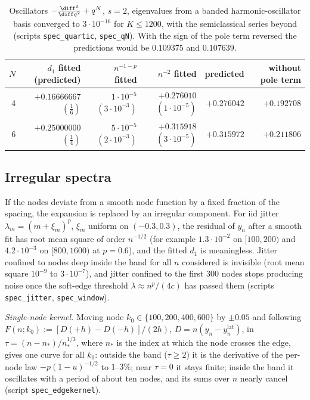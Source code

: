 \begin{table}[ht]
\centering
\small
\begin{tabular}{rrrrrr}
\toprule
$N$ & $d_1$ fitted (predicted) & $n^{-1-p}$ fitted & $n^{-2}$ fitted & predicted & without pole term\\
\midrule
4 & $+0.16666667$ $(\frac16)$ & $1\cdot10^{-5}$ $(3\cdot10^{-3})$ & $+0.276010$ $(1\cdot10^{-5})$ & $+0.276042$ & $+0.192708$\\
6 & $+0.25000000$ $(\frac14)$ & $5\cdot10^{-5}$ $(2\cdot10^{-3})$ & $+0.315918$ $(3\cdot10^{-5})$ & $+0.315972$ & $+0.211806$\\
\bottomrule
\end{tabular}
\caption{Oscillators $-\frac{\diff^2}{\diff q^2}+q^N$, $s=2$, eigenvalues from a banded harmonic-oscillator basis converged to
$3\cdot10^{-16}$ for $K\le1200$, with the semiclassical series beyond (scripts \texttt{spec\_quartic}, \texttt{spec\_qN}). With the
sign of the pole term reversed the predictions would be $0.109375$ and $0.107639$.}
\label{tab:quartic}
\end{table}

\subsection{Irregular spectra}\label{sec:noise}
If the nodes deviate from a smooth node function by a fixed fraction of the spacing, the expansion is replaced by an
irregular component. For iid jitter $\lambda_m=(m+\xi_m)^p$, $\xi_m$ uniform on $(-0.3,0.3)$, the residual of $y_n$ after a smooth
fit has root mean square of order $n^{-1/2}$ (for example $1.3\cdot10^{-2}$ on $[100,200)$ and $4.2\cdot10^{-3}$ on $[800,1600)$ at
$p=0.6$), and the fitted $d_1$ is meaningless. Jitter confined to nodes deep inside the band for all $n$ considered is
invisible (root mean square $10^{-9}$ to $3\cdot10^{-7}$), and jitter confined to the first $300$ nodes stops producing noise once
the soft-edge threshold $\lambda\approx n^p/(4c)$ has passed them (scripts \texttt{spec\_jitter}, \texttt{spec\_window}).

\emph{Single-node kernel.} Moving node $k_0\in\{100,200,400,600\}$ by $\pm0.05$ and following
$F(n;k_0):=[D(+h)-D(-h)]/(2h)$, $D=n(y_n-y_n^{\mathrm{lat}})$, in $\tau=(n-n_*)/n_*^{1/3}$, where $n_*$ is the index at which
the node crosses the edge, gives one curve for all $k_0$: outside the band ($\tau\ge2$) it is the derivative of the per-node
law $-p(1-u)^{-1/2}$ to $1$--$3\%$; near $\tau=0$ it stays finite; inside the band it oscillates with a period of about ten
nodes, and its sums over $n$ nearly cancel (script \texttt{spec\_edgekernel}).

